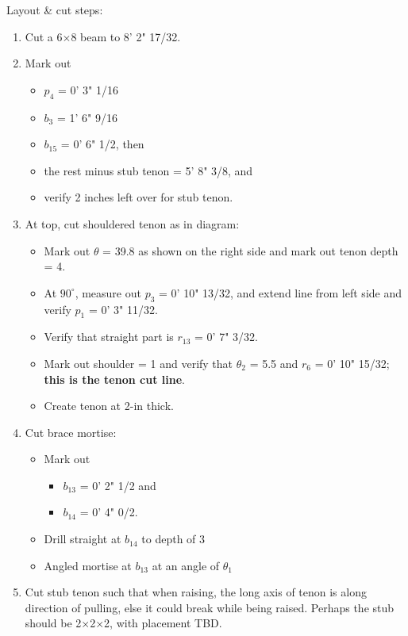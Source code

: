 \documentclass{article}\usepackage[]{graphicx}\usepackage[]{xcolor}
\begin{document}
Layout \& cut steps: 
\begin{enumerate}
  \item Cut a 6$\times$8 beam to 8' 2" 17/32. 
  \item Mark out 
  \begin{itemize}
    \item $p_4$ = 0' 3" 1/16
    \item $b_3$ = 1' 6" 9/16
    \item $b_{15}$ = 0' 6" 1/2, then 
    \item the rest minus stub tenon = 5' 8" 3/8, and 
    \item verify 2 inches left over for stub tenon. 
  \end{itemize}
  \item At top, cut shouldered tenon as in diagram: 
  \begin{itemize}
    \item Mark out $\theta$ = 39.8 as shown on the right side and mark out tenon depth = 4.
    \item At $90^\circ$, measure out $p_3$ = 0' 10" 13/32, and extend line from left side and verify $p_1$ = 0' 3" 11/32.
    \item Verify that straight part is $r_{13}$ = 0' 7" 3/32. 
    \item Mark out shoulder = 1 and verify that $\theta_2$ = 5.5 and $r_6$ = 0' 10" 15/32; \textbf{this is the tenon cut line}.  
    \item Create tenon at 2-in thick. 
  \end{itemize}
  \item Cut brace mortise:
    \begin{itemize}
      \item Mark out 
      \begin{itemize}
        \item $b_{13}$ = 0' 2" 1/2 and 
        \item $b_{14}$ = 0' 4" 0/2.
      \end{itemize}
      \item Drill straight at $b_{14}$ to depth of 3
      \item Angled mortise at $b_{13}$ at an angle of $\theta_1$
    \end{itemize}
  \item Cut stub tenon such that when raising, the long axis of tenon is along direction of pulling, else it could break while being raised. Perhaps the stub should be 2$\times$2$\times$2, with placement TBD. 
\end{enumerate}
\end{document}
